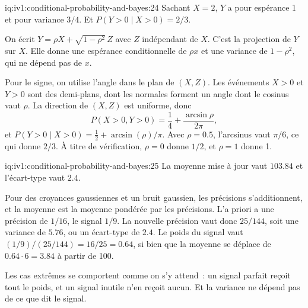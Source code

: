 \begin{solution}{iq:iv1:conditional-probability-and-bayes:24}
Sachant $X = 2$, $Y$ a pour espérance 1 et pour variance $3/4$. Et $P(Y > 0 \mid X > 0) = 2/3$.

On écrit $Y = \rho X + \sqrt{1 - \rho^2}\, Z$ avec $Z$ indépendant de $X$. C'est la projection de $Y$ sur $X$. Elle donne une espérance conditionnelle de $\rho x$ et une variance de $1 - \rho^2$, qui ne dépend pas de $x$.

Pour le signe, on utilise l'angle dans le plan de $(X, Z)$. Les événements $X > 0$ et $Y > 0$ sont des demi-plans, dont les normales forment un angle dont le cosinus vaut $\rho$. La direction de $(X, Z)$ est uniforme, donc
\[
P(X > 0, Y > 0) = \frac14 + \frac{\arcsin \rho}{2\pi},
\]
et $P(Y > 0 \mid X > 0) = \tfrac12 + \arcsin(\rho)/\pi$. Avec $\rho = 0.5$, l'arcsinus vaut $\pi/6$, ce qui donne $2/3$. À titre de vérification, $\rho = 0$ donne $1/2$, et $\rho = 1$ donne 1.

\end{solution}

\enlargethispage{-3\baselineskip}%
\begin{solution}{iq:iv1:conditional-probability-and-bayes:25}
La moyenne mise à jour vaut $103.84$ et l'écart-type vaut $2.4$.

Pour des croyances gaussiennes et un bruit gaussien, les précisions s'additionnent, et la moyenne est la moyenne pondérée par les précisions. L'a priori a une précision de $1/16$, le signal $1/9$. La nouvelle précision vaut donc $25/144$, soit une variance de $5.76$, ou un écart-type de $2.4$. Le poids du signal vaut $(1/9)/(25/144) = 16/25 = 0.64$, si bien que la moyenne se déplace de $0.64 \cdot 6 = 3.84$ à partir de 100.

Les cas extrêmes se comportent comme on s'y attend~: un signal parfait reçoit tout le poids, et un signal inutile n'en reçoit aucun. Et la variance ne dépend pas de ce que dit le signal.

\end{solution}

